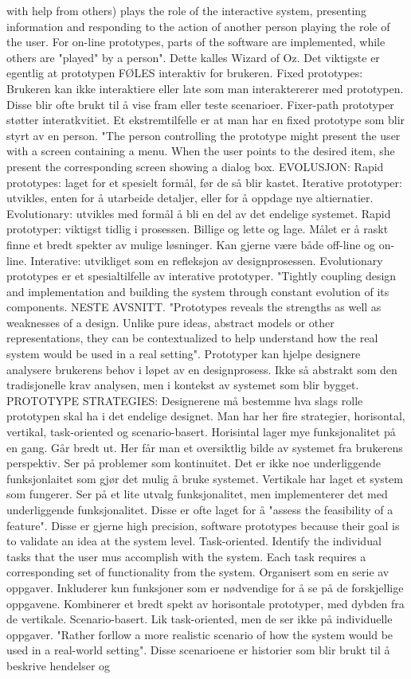 with help from others) plays the role of the interactive system, presenting information and responding to the action of another person playing the role of the user. For on-line prototypes, parts of the software are implemented, while others are "played" by a person". Dette kalles Wizard of Oz. Det viktigste er egentlig at prototypen FØLES interaktiv for brukeren. Fixed prototypes: Brukeren kan ikke interaktiere eller late som man interaktererer med prototypen. Disse blir ofte brukt til å vise fram eller teste scenarioer. Fixer-path prototyper støtter interatkvitiet. Et ekstremtilfelle er at man har en fixed prototype som blir styrt av en person. "The person controlling the prototype might present the user with a screen containing a menu. When the user points to the desired item, she present the corresponding screen showing a dialog  box. EVOLUSJON: Rapid prototypes: laget for et spesielt formål, før de så blir kastet. Iterative prototyper: utvikles, enten for å utarbeide detaljer, eller for å oppdage nye altiernatier. Evolutionary: utvikles med formål å bli en del av det endelige systemet. Rapid prototyper: viktigst tidlig i prosessen. Billige og lette og lage. Målet er å raskt finne et bredt spekter av mulige løsninger. Kan gjerne være både off-line og on-line. Interative: utvikliget som en refleksjon av designprosessen. Evolutionary prototypes er et spesialtilfelle av interative prototyper. "Tightly coupling design and implementation and building the system through constant evolution of its components. NESTE AVSNITT. "Prototypes reveals the strengths as well as weaknesses of a design. Unlike pure ideas, abstract models or other representations, they can be contextualized to help understand how the real system would be used in a real setting". Prototyper kan hjelpe designere analysere brukerens behov i løpet av en designprosess. Ikke så abstrakt som den tradisjonelle krav analysen, men i kontekst av systemet som blir bygget. PROTOTYPE STRATEGIES: Designerene må bestemme hva slags rolle prototypen skal ha i det endelige designet. Man har her fire strategier, horisontal, vertikal, task-oriented og scenario-basert. Horisintal lager mye funksjonalitet på en gang. Går bredt ut. Her får man et oversiktlig bilde av systemet fra brukerens perspektiv. Ser på problemer som kontinuitet. Det er ikke noe underliggende funksjonlaitet som gjør det mulig å bruke systemet. Vertikale har laget et system som fungerer. Ser på et lite utvalg funksjonalitet, men implementerer det med underliggende funksjonalitet. Disse er ofte laget for å "assess the feasibility of a feature". Disse er gjerne high precision, software prototypes because their goal is to validate an idea at the system level. Task-oriented. Identify the individual tasks that the user mus accomplish with the system. Each task requires a corresponding set of functionality from the system. Organisert som en serie av oppgaver. Inkluderer kun funksjoner som er nødvendige for å se på de forskjellige oppgavene. Kombinerer et bredt spekt av horisontale prototyper, med dybden fra de vertikale. Scenario-basert. Lik task-oriented, men de ser ikke på individuelle oppgaver. "Rather forllow a more realistic scenario of how the system would be used in a real-world setting". Disse scenarioene er historier som blir brukt til å beskrive hendelser og 